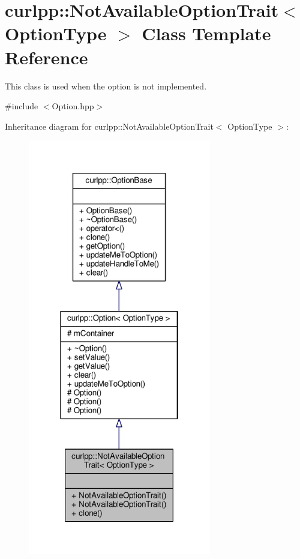 \hypertarget{classcurlpp_1_1NotAvailableOptionTrait}{\section{curlpp\-:\-:Not\-Available\-Option\-Trait$<$ Option\-Type $>$ Class Template Reference}
\label{classcurlpp_1_1NotAvailableOptionTrait}
}


This class is used when the option is not implemented.  




{\ttfamily \#include $<$Option.\-hpp$>$}



Inheritance diagram for curlpp\-:\-:Not\-Available\-Option\-Trait$<$ Option\-Type $>$\-:\nopagebreak
\begin{figure}[H]
\begin{center}
\leavevmode
\includegraphics[width=226pt]{classcurlpp_1_1NotAvailableOptionTrait__inherit__graph}
\end{center}
\end{figure}


